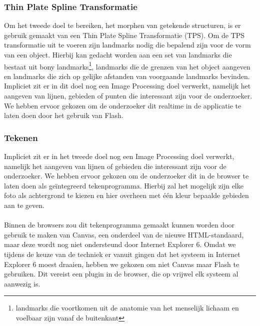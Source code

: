 \subsubsection{Thin Plate Spline Transformatie}
Om het tweede doel te bereiken, het morphen van getekende structuren, is er gebruik gemaakt van een Thin Plate Spline Transformatie (TPS). Om de TPS transformatie uit te voeren zijn landmarks nodig die bepalend zijn voor de vorm van een object. Hierbij kan gedacht worden aan een set van landmarks die bestaat uit bony landmarks\footnote{landmarks die voortkomen uit de anatomie van het menselijk lichaam en voelbaar zijn vanaf de buitenkant}, landmarks die de grenzen van het object aangeven en landmarks die zich op gelijke afstanden van voorgaande landmarks bevinden. 
Impliciet zit er in dit doel nog een Image Processing doel verwerkt, namelijk het aangeven van lijnen, gebieden of punten die interessant zijn voor de onderzoeker. We hebben ervoor gekozen om de onderzoeker dit realtime in de applicatie te laten doen door het gebruik van Flash.


\subsubsection{Tekenen}
Impliciet zit er in het tweede doel nog een Image Processing doel verwerkt, namelijk het aangeven van lijnen of gebieden die interessant zijn voor de onderzoeker. We hebben ervoor gekozen om de onderzoeker dit in de browser te laten doen als ge\"{i}ntegreerd tekenprogramma. Hierbij zal het mogelijk zijn elke foto als achtergrond te kiezen en hier overheen met \'{e}\'{e}n kleur bepaalde gebieden aan te geven.
\\
\\
Binnen de browsers zou dit tekenprogramma gemaakt kunnen worden door gebruik te maken van Canvas, een onderdeel van de nieuwe HTML-standaard, maar deze wordt nog niet ondersteund door Internet Explorer 6. Omdat we tijdens de keuze van de techniek er vanuit gingen dat het systeem in Internet Explorer 6 moest draaien, hebben we gekozen om niet Canvas maar Flash te gebruiken. Dit vereist een plugin in de browser, die op vrijwel elk systeem al aanwezig is.

